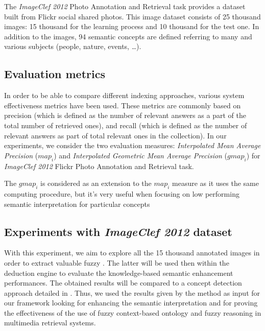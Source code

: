 		The \textit{ImageClef 2012} Photo Annotation and Retrieval task provides a dataset built from
		Flickr social shared photos. This image dataset consists of 25 thousand images:
		15 thousand for the learning process and 10 thousand for the test one. In addition
		to the images, 94 semantic concepts are defined referring to many and various 
		subjects (people, nature, events, \dots). 

		\subsection{Evaluation metrics}
		In order to be able to compare different indexing approaches, various system 
		effectiveness metrics have been used. These metrics are commonly based on precision
		(which is defined as the number of relevant answers as a part of the total number
		of retrieved ones), and recall (which is defined as the number of relevant answers
		as part of total relevant ones in the collection). In our experiments, we consider the two
 		evaluation measures: \emph{Interpolated Mean Average Precision} (\textit{$map_{i}$}) and \emph{Interpolated 
		Geometric Mean Average Precision} (\textit{$gmap_{i}$}) \citep{Thomee2012}
		for  \textit{ImageClef 2012} Flickr Photo Annotation and Retrieval task.

		The \textit{$gmap_{i}$} is considered as an extension to the \textit{$map_{i}$} measure as it uses the same 
		computing procedure, but it's very useful when focusing on low performing semantic 
		interpretation for particular concepts

		
			\subsection{Experiments with \textit{ImageClef 2012} dataset}
		
		With this experiment, we aim to explore all the 15 thousand annotated images in order 
		to extract valuable fuzzy . The latter will be used then within the deduction engine 
		to evaluate the knowledge-based semantic enhancement performances. The obtained results will be compared 
		to a  concept detection approach detailed in \citep{Ksibi2012}. Thus, we
		used the results given by the  method as input for our framework looking 
		for enhancing the semantic interpretation and for proving the effectiveness of the use of
		fuzzy context-based ontology and fuzzy reasoning in multimedia retrieval
		systems.


